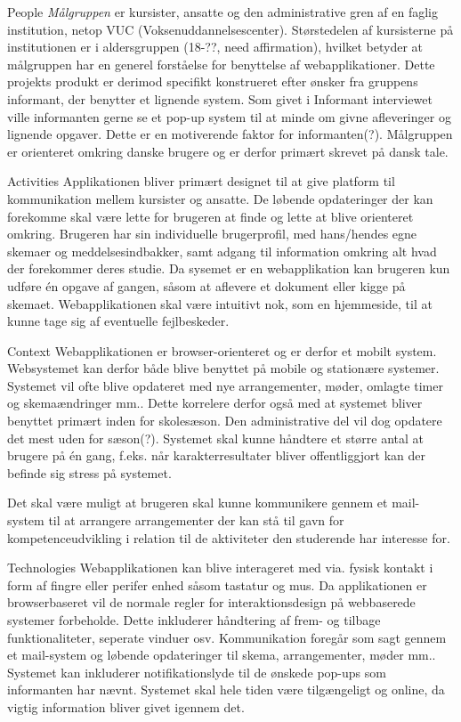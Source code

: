 People
\textit{Målgruppen} er kursister, ansatte og den administrative gren af en faglig institution, netop VUC (Voksenuddannelsescenter). Størstedelen af kursisterne på institutionen er i aldersgruppen (18-??, need affirmation), hvilket betyder at målgruppen har en generel forståelse for benyttelse af webapplikationer. Dette projekts produkt er derimod specifikt konstrueret efter ønsker fra gruppens informant, der benytter et lignende system.
Som givet i Informant interviewet ville informanten gerne se et pop-up system til at minde om givne afleveringer og lignende opgaver. Dette er en motiverende faktor for informanten(?). Målgruppen er orienteret omkring danske brugere og er derfor primært skrevet på dansk tale.

Activities
Applikationen bliver primært designet til at give platform til kommunikation mellem kursister og ansatte. De løbende opdateringer der kan forekomme skal være lette for brugeren at finde og lette at blive orienteret omkring.
Brugeren har sin individuelle brugerprofil, med hans/hendes egne skemaer og meddelsesindbakker, samt adgang til information omkring alt hvad der forekommer deres studie. Da sysemet er en webapplikation kan brugeren kun udføre én opgave af gangen, såsom at aflevere et dokument eller kigge på skemaet. Webapplikationen skal være intuitivt nok, som en hjemmeside, til at kunne tage sig af eventuelle fejlbeskeder.

Context
Webapplikationen er browser-orienteret og er derfor et mobilt system. Websystemet kan derfor både blive benyttet på mobile og stationære systemer. Systemet vil ofte blive opdateret med nye arrangementer, møder, omlagte timer og skemaændringer mm.. Dette korrelere derfor også med at systemet bliver benyttet primært inden for skolesæson. Den administrative del vil dog opdatere det mest uden for sæson(?). Systemet skal kunne håndtere et større antal at brugere på én gang, f.eks. når karakterresultater bliver offentliggjort kan der befinde sig stress på systemet.

Det skal være muligt at brugeren skal kunne kommunikere gennem et mail-system til at arrangere arrangementer der kan stå til gavn for kompetenceudvikling i relation til de aktiviteter den studerende har interesse for.

Technologies
Webapplikationen kan blive interageret med via. fysisk kontakt i form af fingre eller perifer enhed såsom tastatur og mus. Da applikationen er browserbaseret vil de normale regler for interaktionsdesign på webbaserede systemer forbeholde. Dette inkluderer håndtering af frem- og tilbage funktionaliteter, seperate vinduer osv. 
Kommunikation foregår som sagt gennem et mail-system og løbende opdateringer til skema, arrangementer, møder mm..
Systemet kan inkluderer notifikationslyde til de ønskede pop-ups som informanten har nævnt.
Systemet skal hele tiden være tilgængeligt og online, da vigtig information bliver givet igennem det.
